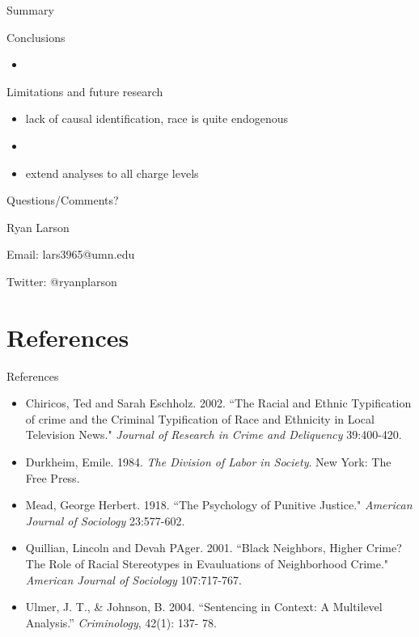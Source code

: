 \documentclass{beamer}
\begin{document}
\begin{frame}{Summary}
\begin{block}{Conclusions}
\begin{itemize}
\item 

\end{itemize}
\end{block}

\begin{block}{Limitations and future research}
\begin{itemize}
\item lack of causal identification, race is quite endogenous
\item 
\item extend analyses to all charge levels
\end{itemize}
\end{block}
\end{frame}

\begin{frame}{Questions/Comments?}

\begin{block}

\item Ryan Larson
\item Email: lars3965@umn.edu
\item Twitter: @ryanplarson

\end{block}

\end{frame}


\section{References}

\begin{frame}{References}
\begin{itemize}
\item Chiricos, Ted and Sarah Eschholz. 2002. ``The Racial and Ethnic Typification of crime and the Criminal Typification of Race and Ethnicity in Local Television News." \textit{Journal of Research in Crime and Deliquency} 39:400-420. 
\item Durkheim, Emile. 1984. \textit{The Division of Labor in Society}. New York: The Free Press. 
\item Mead, George Herbert. 1918. ``The Psychology of Punitive Justice."
 \textit{American Journal of Sociology} 23:577-602.
\item Quillian, Lincoln and Devah PAger. 2001. ``Black Neighbors, Higher Crime? The Role of Racial Stereotypes in Evauluations of Neighborhood Crime." \textit{American Journal of Sociology} 107:717-767.
\item Ulmer, J. T., & Johnson, B. 2004. ``Sentencing in Context: A Multilevel Analysis.” \textit{Criminology}, 42(1): 137-	78.
\end{itemize}
\end{frame}
\end{document}
